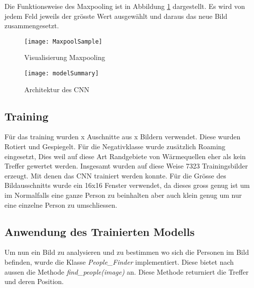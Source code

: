 \noindent Die Funktionsweise des Maxpooling ist in Abbildung \ref{fig:maxpoolSample} dargestellt. Es wird von jedem Feld jeweils der grösste Wert ausgewählt und daraus das neue Bild zusammengesetzt.

\begin{figure}[H]
	\centering
	\texttt{[image: MaxpoolSample]}
	\caption{Visualisierung Maxpooling \parencite{MaxpoolImg2018}}
	\label{fig:maxpoolSample}
\end{figure}

\begin{figure}[H]
	\centering
	\texttt{[image: modelSummary]}
	\caption{Architektur des CNN}
	\label{fig:cnnArchitecture}
\end{figure}

\subsection{Training}

Für das training wurden x Auschnitte aus x Bildern verwendet. Diese wurden Rotiert und Gespiegelt. Für die Negativklasse wurde zusätzlich Roaming eingesetzt, Dies weil auf diese Art Randgebiete von Wärmequellen eher als kein Treffer gewertet werden. Insgesamt wurden auf diese Weise 7323 Trainingsbilder erzeugt. Mit denen das \gls{CNN} trainiert werden konnte. Für die Grösse des Bildausschnitts wurde ein 16x16 Fenster verwendet, da dieses gross genug ist um im Normalfalls eine ganze Person zu beinhalten aber auch klein genug um nur eine einzelne Person zu umschliessen.

\subsection{Anwendung des Trainierten Modells}

Um nun ein Bild zu analysieren und zu bestimmen wo sich die Personen im Bild befinden, wurde die Klasse \textit{People\_Finder} implementiert. Diese bietet nach aussen die Methode \textit{find\_people(image)} an. Diese Methode returniert die Treffer und deren Position. 



